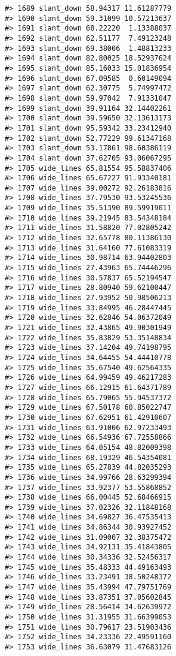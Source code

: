 \documentclass[
]{book}
\theoremstyle{definition}
\theoremstyle{definition}
\theoremstyle{definition}
\theoremstyle{definition}
\theoremstyle{remark}
\begin{document}
\begin{verbatim}
#> 1689 slant_down 58.94317 11.61287779
#> 1690 slant_down 59.31099 10.57213637
#> 1691 slant_down 68.22220  1.13388037
#> 1692 slant_down 62.51177  7.49123248
#> 1693 slant_down 69.38006  1.48813233
#> 1694 slant_down 82.80025 18.52937624
#> 1695 slant_down 85.16033 15.01836954
#> 1696 slant_down 67.09585  0.60149094
#> 1697 slant_down 62.30775  5.74997472
#> 1698 slant_down 59.97042  7.91331047
#> 1699 slant_down 39.91164 32.14402261
#> 1700 slant_down 39.59650 32.13613173
#> 1701 slant_down 95.59342 33.23412940
#> 1702 slant_down 52.77229 99.61347168
#> 1703 slant_down 53.17861 98.60386119
#> 1704 slant_down 37.62705 93.06067295
#> 1705 wide_lines 65.81554 95.58837406
#> 1706 wide_lines 65.67227 91.93340181
#> 1707 wide_lines 39.00272 92.26183816
#> 1708 wide_lines 37.79530 93.53245536
#> 1709 wide_lines 35.51390 89.59919011
#> 1710 wide_lines 39.21945 83.54348184
#> 1711 wide_lines 31.58820 77.02805242
#> 1712 wide_lines 32.65778 80.11386130
#> 1713 wide_lines 31.64160 77.61083319
#> 1714 wide_lines 30.98714 63.94402803
#> 1715 wide_lines 27.43963 65.74446296
#> 1716 wide_lines 30.57837 65.52194547
#> 1717 wide_lines 28.80940 59.62100447
#> 1718 wide_lines 27.93952 50.98506213
#> 1719 wide_lines 33.84995 46.28447445
#> 1720 wide_lines 32.62846 54.06372049
#> 1721 wide_lines 32.43865 49.90301949
#> 1722 wide_lines 35.83829 53.35148834
#> 1723 wide_lines 37.14204 49.74198795
#> 1724 wide_lines 34.64455 54.44410778
#> 1725 wide_lines 35.67540 49.62564335
#> 1726 wide_lines 64.99459 49.46217283
#> 1727 wide_lines 66.12915 61.64371789
#> 1728 wide_lines 65.79065 55.94537372
#> 1729 wide_lines 67.50178 60.85022747
#> 1730 wide_lines 67.62951 61.42910607
#> 1731 wide_lines 63.91006 62.97233493
#> 1732 wide_lines 66.54936 67.72558866
#> 1733 wide_lines 64.05154 48.82009398
#> 1734 wide_lines 68.19329 46.54354081
#> 1735 wide_lines 65.27839 44.82035293
#> 1736 wide_lines 34.99766 28.63299394
#> 1737 wide_lines 33.92377 53.55868852
#> 1738 wide_lines 66.00445 52.68466915
#> 1739 wide_lines 37.02326 32.11848168
#> 1740 wide_lines 34.69827 36.47535413
#> 1741 wide_lines 34.86344 30.93927452
#> 1742 wide_lines 31.09007 32.38375472
#> 1743 wide_lines 34.92131 35.41843805
#> 1744 wide_lines 30.34336 32.52456317
#> 1745 wide_lines 35.48333 44.49163493
#> 1746 wide_lines 33.23491 38.50248372
#> 1747 wide_lines 35.43994 47.79751769
#> 1748 wide_lines 33.87351 37.05602845
#> 1749 wide_lines 28.56414 34.62639972
#> 1750 wide_lines 31.31955 31.66399053
#> 1751 wide_lines 30.79617 23.51903436
#> 1752 wide_lines 34.23336 22.49591160
#> 1753 wide_lines 36.63079 31.47683126

\end{verbatim}
\end{document}
